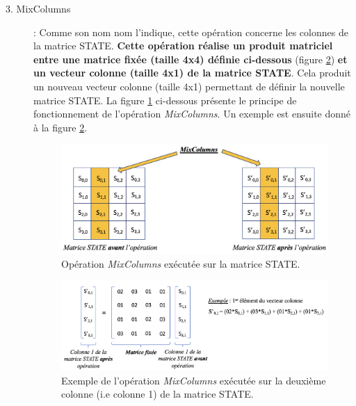 \documentclass[oneside]{book}
\begin{document}
\begin{description}
\item[3. MixColumns] : Comme son nom nom l'indique, cette opération concerne les colonnes de la matrice STATE. \textbf{Cette opération réalise un produit matriciel entre une matrice fixée (taille 4x4) définie ci-dessous} (figure \ref{fig:colonnebis}) \textbf{et un vecteur colonne (taille 4x1) de la matrice STATE}. Cela produit un nouveau vecteur colonne (taille 4x1) permettant de définir la nouvelle matrice STATE.
La figure \ref{fig:colonne} ci-dessous présente le principe de fonctionnement de l'opération \textit{MixColumns}. Un exemple est ensuite donné à la figure \ref{fig:colonnebis}.
\begin{figure}[htbp]
    \centering
    \includegraphics[scale=0.42]{image/colonne}
    \caption{Opération \textit{MixColumns} exécutée sur la matrice STATE.}
    \label{fig:colonne}
\end{figure}
\begin{figure}[htbp]
    \centering
    \includegraphics[scale=0.54]{image/colonnebis}
    \caption{Exemple de l'opération \textit{MixColumns} exécutée sur la deuxième colonne (i.e colonne 1) de la matrice STATE.}
    \label{fig:colonnebis}
\end{figure}


\end{description}
\end{document}
